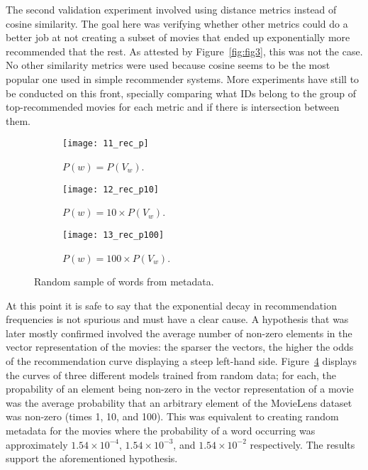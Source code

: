 The second validation experiment involved using distance metrics instead of
cosine similarity. The goal here was verifying whether other metrics could
do a better job at not creating a subset of movies that ended up exponentially
more recommended that the rest. As attested by Figure~\ref{fig:fig3}, this was
not the case. No other similarity metrics were used because cosine seems to be
the most popular one used in simple recommender systems. More experiments have
still to be conducted on this front, specially comparing what IDs belong to
the group of top-recommended movies for each metric and if there is intersection
between them.

\begin{figure}
  \centering
  \begin{subfigure}{0.3\textwidth}
    \centering
    \texttt{[image: 11\_rec\_p]}
    \caption{$P(w) = P(V_w)$.\label{fig:fig4:a}}
  \end{subfigure}
  \begin{subfigure}{0.3\textwidth}
    \centering
    \texttt{[image: 12\_rec\_p10]}
    \caption{$P(w) = 10 \times P(V_w)$.\label{fig:fig4:b}}
  \end{subfigure}
  \begin{subfigure}{0.3\textwidth}
    \centering
    \texttt{[image: 13\_rec\_p100]}
    \caption{$P(w) = 100 \times P(V_w)$.\label{fig:fig4:c}}
  \end{subfigure}
  \caption{Random sample of words from metadata.\label{fig:fig4}}
\end{figure}

At this point it is safe to say that the exponential decay in recommendation
frequencies is not spurious and must have a clear cause. A hypothesis that was
later mostly confirmed involved the average number of non-zero elements in the
vector representation of the movies: the sparser the vectors, the higher the
odds of the recommendation curve displaying a steep left-hand side.
Figure~\ref{fig:fig4} displays the curves of three different models trained from
random data; for each, the propability of an element being non-zero in the
vector representation of a movie was the average probability that an arbitrary
element of the MovieLens dataset was non-zero (times 1, 10, and 100). This was
equivalent to creating random metadata for the movies where the probability of a
word occurring was approximately $1.54 \times 10^{-4}$, $1.54 \times 10^{-3}$,
and $1.54 \times 10^{-2}$ respectively. The results support the aforementioned
hypothesis.

